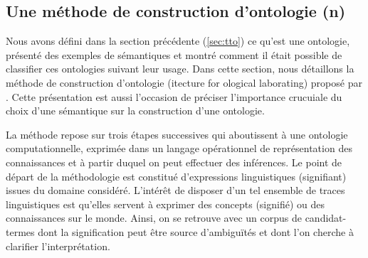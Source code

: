 \subsection{Une méthode de construction d'ontologie (n)}\label{chap:construction}
Nous avons défini dans la section précédente (\ref{sec:tto}) ce qu'est une ontologie,  présenté des exemples de sémantiques et montré comment il était possible de classifier ces ontologies suivant leur usage. 
Dans cette section, nous détaillons la méthode de construction d'ontologie  (itecture for ological laborating) proposé par \cite{Bachimont2000a}.
Cette présentation est aussi l'occasion de préciser l'importance crucuiale du choix d'une sémantique sur la construction d'une ontologie.

La méthode repose sur trois étapes successives qui aboutissent à une ontologie computationnelle, exprimée dans un langage opérationnel de représentation des connaissances et à partir duquel on peut effectuer des inférences. 
	Le point de départ de la méthodologie est constitué d'expressions linguistiques (signifiant) issues du domaine considéré.
	L'intérêt de disposer d'un tel ensemble de traces linguistiques est qu'elles servent à exprimer des concepts (signifié) ou des connaissances sur le monde. 
	Ainsi, on se retrouve avec un corpus de candidat-termes dont la signification peut être source d'ambiguïtés et dont l'on cherche à clarifier l'interprétation.
